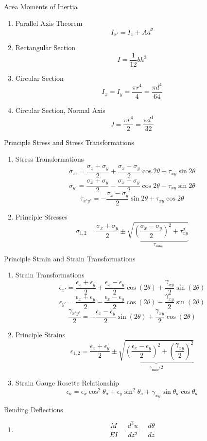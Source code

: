 \begin{multicols*}{2}[]
\begin{enumerate}
\end{enumerate}
\vspace{20.5em}
Area Moments of Inertia
\vspace{-0.5em}
\begin{enumerate}
    \item[] Parallel Axis Theorem \[I_{x'} = I_x +Ad^2\]
    \item[] Rectangular Section \[I = \frac{1}{12}bh^3\]
    \item[] Circular Section \[I_x = I_y = \frac{\pi r^4}{4} = \frac{\pi d^4}{64}\]
    \item[] Circular Section, Normal Axis \[J = \frac{\pi r^4}{2} = \frac{\pi d^4}{32}\]
\end{enumerate}
\vspace{-1em}
Principle Stress and Stress Transformations
\vspace{-1em}
\begin{enumerate}
    \item[] Stress Transformations \[\sigma_{x'} = \frac{\sigma_x + \sigma_y}{2}+ \frac{\sigma_x - \sigma_y}{2}\cos 2\theta + \tau_{xy}\sin2\theta\]
    \[\sigma_{y'} = \frac{\sigma_x + \sigma_y}{2} - \frac{\sigma_x - \sigma_y}{2}\cos 2\theta - \tau_{xy}\sin2\theta\]
    \[\tau_{x'y'} = -\frac{\sigma_x -\sigma_y}{2}\sin2\theta + \tau_{xy}\cos2\theta\]
    \item[] Principle Stresses \[\sigma_{1,2} = \frac{\sigma_x + \sigma_y}{2} \pm \underbrace{\sqrt{\left(\frac{\sigma_x - \sigma_y}{2}\right)^2 + \tau_{xy}^2}}_{\tau_{\text{max}}}\]
\end{enumerate}
\vspace{-1em}
Principle Strain and Strain Transformations
\vspace{-1em}
\begin{enumerate}
    \item[] Strain Transformations \[\epsilon_{x'} = \frac{\epsilon_x + \epsilon_y}{2} + \frac{\epsilon_x-\epsilon_y}{2}\cos(2\theta) + \frac{\gamma_{xy}}{2}\sin(2\theta)\]
    \[\epsilon_{y'} = \frac{\epsilon_x + \epsilon_y}{2} - \frac{\epsilon_x-\epsilon_y}{2}\cos(2\theta) - \frac{\gamma_{xy}}{2}\sin(2\theta)\]
    \[\frac{\gamma_{x'y'}}{2} = - \frac{\epsilon_x-\epsilon_y}{2}\sin(2\theta) + \frac{\gamma_{xy}}{2}\cos(2\theta)\]
    \item[] Principle Strains \[\epsilon_{1,2} = \frac{\epsilon_x+\epsilon_y}{2}\pm \underbrace{\sqrt{\left(\frac{\epsilon_x-\epsilon_y}{2}\right)^2 + \left(\frac{\gamma_{xy}}{2}\right)^2}}_{\gamma_{\text{max}}/2}\]
    \item[] Strain Gauge Rosette Relationship \[\epsilon_a = \epsilon_x\cos^2\theta_a + \epsilon_y \sin^2\theta_a + \gamma_{xy}\sin\theta_a\cos\theta_a\]
\end{enumerate}
\vspace{-1em}
Bending Deflections
\vspace{-1em}
\begin{enumerate}
    \item[] \[\frac{M}{EI} = \frac{d^2u}{dz^2} = \frac{d\theta}{dz}\]
\end{enumerate}
\end{multicols*}

